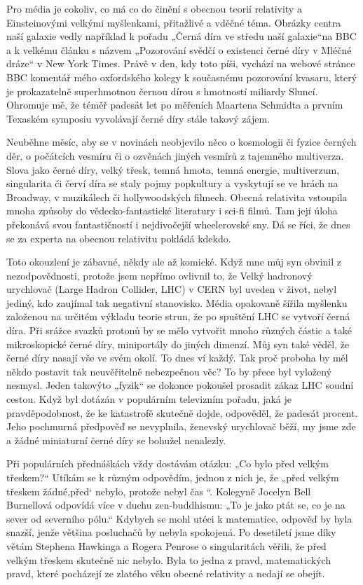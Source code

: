   Pro média je cokoliv, co má co do činění s obecnou teorií relativity a Einsteinovými velkými
  myšlenkami, přitažlivé a vděčné téma. Obrázky centra naší galaxie vedly například k pořadu „Černá
  díra ve středu naší galaxie“na BBC a k velkému článku s názvem „Pozorování svědčí o existenci
  černé díry v Mléčné dráze“ v New York Times. Právě v den, kdy toto píši, vychází na webové stránce
  BBC komentář mého oxfordského kolegy k současnému pozorování kvasaru, který je prokazatelně
  superhmotnou černou dírou s hmotností miliardy Sluncí. Ohromuje mě, že téměř padesát let po
  měřeních Maartena Schmidta a prvním Texaském symposiu vyvolávají černé díry stále takový zájem.
  
  Neuběhne měsíc, aby se v novinách neobjevilo něco o kosmologii či fyzice černých děr, o počátcích
  vesmíru či o ozvěnách jiných vesmírů z tajemného multiverza. Slova jako černé díry, velký třesk,
  temná hmota, temná energie, multiverzum, singularita či červí díra se staly pojmy popkultury a
  vyskytují se ve hrách na Broadway, v muzikálech či hollywoodských filmech. Obecná relativita
  vstoupila mnoha způsoby do vědecko-fantastické literatury i sci-fi filmů. Tam její úloha překonává
  svou fantastičností i nejdivočejší wheelerovské sny. Dá se říci, že dnes se za experta na obecnou
  relativitu pokládá kdekdo. 
  
  Toto okouzlení je zábavné, někdy ale až komické. Když mne můj syn obvinil z nezodpovědnosti,
  protože jsem nepřímo ovlivnil to, že Velký hadronový urychlovač (Large Hadron Collider, LHC) v
  CERN byl uveden v život, nebyl jediný, kdo zaujímal tak negativní stanovisko. Média opakovaně
  šířila myšlenku založenou na určitém výkladu teorie strun, že po spuštění LHC se vytvoří černá
  díra. Při srážce svazků protonů by se mělo vytvořit mnoho různých částic a také mikroskopické
  černé díry, miniportály do jiných dimenzí. Můj syn také věděl, že černé díry nasají vše ve svém
  okolí. To dnes ví každý. Tak proč proboha by měl někdo postavit tak neuvěřitelně nebezpečnou věc?
  To by přece byl vyložený nesmysl. Jeden takovýto „fyzik“ se dokonce pokoušel prosadit zákaz LHC
  soudní cestou. Když byl dotázán v populárním televizním pořadu, jaká je pravděpodobnost, že ke
  katastrofě skutečně dojde, odpověděl, že padesát procent. Jeho pochmurná předpověď se nevyplnila,
  ženevský urychlovač běží, my jsme zde a žádné miniaturní černé díry se bohužel nenalezly. 
  
  Při populárních přednáškách vždy dostávám otázku: „Co bylo před velkým třeskem?“ Utíkám se k
  různým odpovědím, jednou z nich je, že „před velkým třeskem žádné,před‘ nebylo, protože nebyl čas
  “. Kolegyně Jocelyn Bell Burnellová odpovídá více v duchu zen-buddhismu: „To je jako ptát se, co
  je na sever od severního pólu.“ Kdybych se mohl utéci k matematice, odpověď by byla snazší, jenže
  většina posluchačů by nebyla spokojená. Po desetiletí jsme díky větám Stephena Hawkinga a Rogera
  Penrose o singularitách věřili, že před velkým třeskem skutečně nic nebylo. Byla to jedna z pravd,
  matematických pravd, které pocházejí ze zlatého věku obecné relativity a nedají se obejít. 
  
